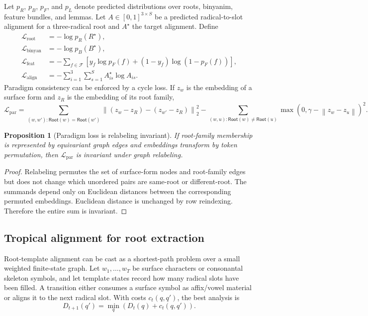 \documentclass[11pt]{article}
\theoremstyle{definition}
\theoremstyle{plain}
\newtheorem{proposition}[definition]{Proposition}
\theoremstyle{remark}
\numberwithin{equation}{section}
\newcommand{\Root}{\mathsf{Root}}
\newcommand{\norm}[1]{\left\lVert #1\right\rVert}
\begin{document}
Let $p_R$, $p_B$, $p_F$, and $p_L$ denote predicted distributions over roots, binyanim, feature bundles, and lemmas.  Let $A\in[0,1]^{3\times S}$ be a predicted radical-to-slot alignment for a three-radical root and $A^\star$ the target alignment.  Define
\begin{align}
  \mathcal L_{\mathrm{root}} &= -\log p_R(R^\star),\\
  \mathcal L_{\mathrm{binyan}} &= -\log p_B(B^\star),\\
  \mathcal L_{\mathrm{feat}} &= -\sum_{f\in\mathcal F}\left[y_f\log p_F(f)+(1-y_f)\log(1-p_F(f))\right],\\
  \mathcal L_{\mathrm{align}} &= -\sum_{i=1}^3\sum_{s=1}^S A^\star_{is}\log A_{is}.
\end{align}
Paradigm consistency can be enforced by a cycle loss.  If $z_w$ is the embedding of a surface form and $z_R$ is the embedding of its root family,
\begin{equation}
  \mathcal L_{\mathrm{par}}=\sum_{(w,w'):\Root(w)=\Root(w')}\norm{(z_w-z_R)-(z_{w'}-z_R)}_2^2
  -\sum_{(w,u):\Root(w)\ne\Root(u)}\max(0,\gamma-\norm{z_w-z_u})^2.
\end{equation}

\begin{proposition}[Paradigm loss is relabeling invariant]
If root-family membership is represented by equivariant graph edges and embeddings transform by token permutation, then $\mathcal L_{\mathrm{par}}$ is invariant under graph relabeling.
\end{proposition}

\begin{proof}
Relabeling permutes the set of surface-form nodes and root-family edges but does not change which unordered pairs are same-root or different-root.  The summands depend only on Euclidean distances between the corresponding permuted embeddings.  Euclidean distance is unchanged by row reindexing.  Therefore the entire sum is invariant.
\end{proof}

\subsection{Tropical alignment for root extraction}

Root-template alignment can be cast as a shortest-path problem over a small weighted finite-state graph.  Let $w_1,\ldots,w_T$ be surface characters or consonantal skeleton symbols, and let template states record how many radical slots have been filled.  A transition either consumes a surface symbol as affix/vowel material or aligns it to the next radical slot.  With costs $c_t(q,q')$, the best analysis is
\begin{equation}
  D_{t+1}(q')=\min_q\left(D_t(q)+c_t(q,q')\right).
\end{equation}
\end{document}
